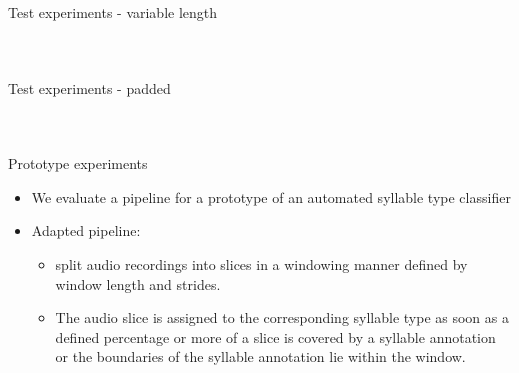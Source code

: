 \documentclass[10pt]{beamer}
\begin{document}
\begin{frame}{Test experiments - variable length}
\begin{columns}
\vspace{-3mm}
\begin{figure}[ht!]
\centering
  
  \label{fig:model_distribution_sct_compressed}
\end{figure}
\vspace{-2.5cm}
\begin{table}[h!]
\scalebox{.48}{}
\label{tab:result_overview_sct_compressed}
\end{table}
\end{columns}
\end{frame}

\begin{frame}{Test experiments - padded}
\begin{columns}
\vspace{-3mm}
\begin{figure}[ht!]
\centering
  
  \label{fig:model_distribution_sct_compressed}
\end{figure}
\vspace{-3mm}
\begin{table}[h!]
\scalebox{.48}{}
\label{tab:result_overview_sct_compressed}
\end{table}
\end{columns}
\end{frame}

\begin{frame}{Prototype experiments}
\begin{itemize}
\item We evaluate a pipeline for a prototype of an automated syllable type classifier
\item Adapted pipeline:
\begin{itemize}
\item split audio recordings into slices in a windowing manner defined by window length and strides.
\item The audio slice is assigned to the corresponding syllable type as soon as a defined percentage or more of a slice is covered by a syllable annotation or the boundaries of the syllable annotation lie within the window.
\end{itemize}
\end{itemize}
\end{frame}
\end{document}
